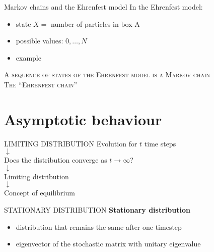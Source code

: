\documentclass[usenames,dvipsnames]{beamer}
\begin{document}
  \begin{frame}{Markov chains and the Ehrenfest model}
    \Large In the Ehrenfest model:
    \normalsize
    \begin{itemize}
      \item<1-> state $X = $ number of particles in box A
      \item<2-> possible values: $0, \dots, N$
      \item<3-> example
    \end{itemize}
    
    \begin{figure}[r]
    \end{figure}
  \end{frame}

  \begin{frame}[standout]
    \textsc{A sequence of states of the Ehrenfest model is a Markov chain}\\
    \vspace{30pt}
    \textsc{The \enquote{Ehrenfest chain}}
  \end{frame}


  \section{Asymptotic behaviour}
  \begin{frame}{LIMITING DISTRIBUTION}
    \centering
    Evolution for $t$ time steps\\\medskip
    $\downarrow$\\\medskip
    Does the distribution converge as $t \rightarrow \infty$?\\\medskip
    $\downarrow$\\\medskip
    \alert{Limiting distribution}\\\medskip
    $\downarrow$\\\medskip
    Concept of \alert{equilibrium}
  \end{frame}

  \begin{frame}{STATIONARY DISTRIBUTION}
    \centering
    \Large \textbf{Stationary distribution}
    \normalsize
    \begin{itemize}
      \item distribution that \alert{remains the same} after one timestep
      \item \alert{eigenvector} of the stochastic matrix with unitary eigenvalue
    \end{itemize}
  \end{frame}
\end{document}
